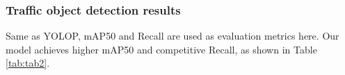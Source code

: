 \documentclass[10pt,twocolumn,letterpaper]{article}
\begin{document}
\subsubsection{Traffic object detection results}
Same as YOLOP, mAP50 and Recall are used as evaluation metrics here. Our model achieves higher mAP50 and competitive Recall, as shown in Table \ref{tab:tab2}.

\begin{table}[htbp]
    \footnotesize
    \begin{center}
    \end{center}
    \caption{Results on traffic object detection.}
    \label{tab:tab2}
\end{table}
\end{document}
